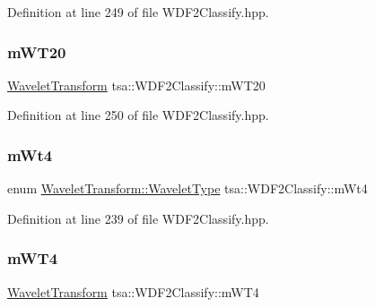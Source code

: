Definition at line 249 of file W\+D\+F2\+Classify.\+hpp.

\mbox{\label{classtsa_1_1_w_d_f2_classify_a1d63a00182c81bacff1db01478515ed4}} 
\subsubsection{\texorpdfstring{m\+W\+T20}{mWT20}}
{\footnotesize\ttfamily \hyperlink{classtsa_1_1_wavelet_transform}{Wavelet\+Transform} tsa\+::\+W\+D\+F2\+Classify\+::m\+W\+T20\hspace{0.3cm}{\ttfamily [private]}}



Definition at line 250 of file W\+D\+F2\+Classify.\+hpp.

\mbox{\label{classtsa_1_1_w_d_f2_classify_a209bba3065cf607d1ecc47d4d599d139}} 
\subsubsection{\texorpdfstring{m\+Wt4}{mWt4}}
{\footnotesize\ttfamily enum \hyperlink{classtsa_1_1_wavelet_transform_a5a529de70e0004333fcf23b9cca88ce7}{Wavelet\+Transform\+::\+Wavelet\+Type} tsa\+::\+W\+D\+F2\+Classify\+::m\+Wt4\hspace{0.3cm}{\ttfamily [private]}}



Definition at line 239 of file W\+D\+F2\+Classify.\+hpp.

\mbox{\label{classtsa_1_1_w_d_f2_classify_acb6943d4b183f37e6a6f236d7d6c2484}} 
\subsubsection{\texorpdfstring{m\+W\+T4}{mWT4}}
{\footnotesize\ttfamily \hyperlink{classtsa_1_1_wavelet_transform}{Wavelet\+Transform} tsa\+::\+W\+D\+F2\+Classify\+::m\+W\+T4\hspace{0.3cm}{\ttfamily [private]}}



